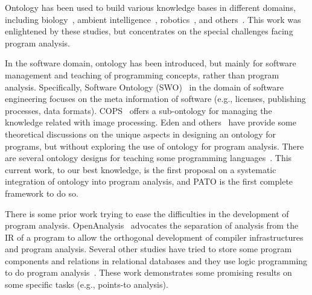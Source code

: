 Ontology has been used to build various knowledge bases in
different domains, including biology~\cite{ashburner2000gene},
ambient
intelligence~\cite{ducatel2001scenarios,preuveneers2004towards,rodriguez2014survey},
robotics~\cite{tenorth2009knowrob}, and
others~\cite{matuszek2006introduction,niles2001towards,pease2002suggested}.
This work was enlightened by these studies, but concentrates on the
special challenges facing program analysis.

In the software domain, ontology has been introduced, but mainly for
software management and teaching of programming concepts, rather than
program analysis. Specifically, Software Ontology
(SWO)~\cite{malone2014software} in the domain of software engineering
focuses on the meta information of software (e.g., licenses,
publishing processes, data formats). COPS~\cite{lando2007towards}
offers a sub-ontology for managing the knowledge related with image
processing. Eden and others~\cite{eden2007problems} have provide some
theoretical discussions on the unique aspects in designing an ontology
for programs, but without exploring the use of ontology for program
analysis. There are several ontology designs for teaching some
programming
languages~\cite{sosnovsky2006development,ganapathi2011towards}.  This
current work, to our best knowledge, is the first proposal on a
systematic integration of ontology into program analysis, and PATO
is the first complete framework to do so.

There is some prior work trying to ease the difficulties in the
development of program analysis. OpenAnalysis~\cite{OpenAnalysis}
advocates the separation of analysis from the IR of a program to allow
the orthogonal development of compiler infrastructures and program
analysis. Several other studies have tried to store some program
components and relations in relational databases and they use logic
programming to do program
analysis~\cite{hajiyev2006codequest,bravenboer2009strictly,whaley2005using}.
These work demonstrates some promising results on some specific tasks
(e.g., points-to analysis). 

